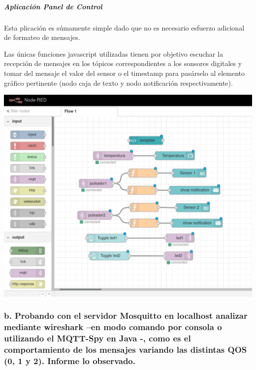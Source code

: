 \documentclass[11pt]{article}
\makeatletter
\def\maxwidth{\ifdim\Gin@nat@width>\linewidth\linewidth
    \else\Gin@nat@width\fi}
\let\Oldincludegraphics\includegraphics
\renewcommand{\includegraphics}[1]{\Oldincludegraphics[width=.8\maxwidth]{#1}}
\makeatother
\begin{document}
    \hypertarget{aplicaciuxf3n-panel-de-control}{%
\subparagraph{Aplicación Panel de
Control}\label{aplicaciuxf3n-panel-de-control}}

Esta plicación es súmamente simple dado que no es necesario esfuerzo
adicional de formateo de mensajes.

Las únicas funciones javascript utilizadas tienen por objetivo escuchar
la recepción de mensajes en los tópicos correspondientes a los sonsores
digitales y tomar del mensaje el valor del sensor o el timestamp para
pasárselo al elemento gráfico pertinente (nodo caja de texto y nodo
notificación respectivamente).

    \includegraphics{images/node-red-panel-control.png}

    \hypertarget{b.-probando-con-el-servidor-mosquitto-en-localhost-analizar-mediante-wireshark-en-modo-comando-por-consola-o-utilizando-el-mqtt-spy-en-java---como-es-el-comportamiento-de-los-mensajes-variando-las-distintas-qos-0-1-y-2.-informe-lo-observado.}{%
\subsubsection{b. Probando con el servidor Mosquitto en localhost
analizar mediante wireshark --en modo comando por consola o utilizando
el MQTT-Spy en Java -, como es el comportamiento de los mensajes
variando las distintas QOS (0, 1 y 2). Informe lo
observado.}\label{b.-probando-con-el-servidor-mosquitto-en-localhost-analizar-mediante-wireshark-en-modo-comando-por-consola-o-utilizando-el-mqtt-spy-en-java---como-es-el-comportamiento-de-los-mensajes-variando-las-distintas-qos-0-1-y-2.-informe-lo-observado.}}
\end{document}

